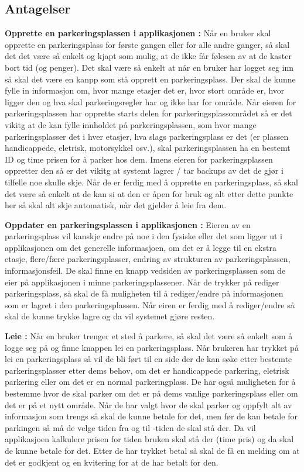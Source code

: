 \documentclass[12pt]{article}
\begin{document}
    \subsection{Antagelser}
    \textbf{Opprette en parkeringsplassen i applikasjonen :} Når en bruker skal opprette en parkeringsplass for første gangen eller for alle andre ganger, så skal det det være så enkelt og kjapt som mulig, at de ikke får følesen av at de kaster bort tid (og penger). Det skal være så enkelt at når en bruker har logget seg inn så skal det være en kanpp som stå opprett en parkeringsplass. Der skal de kunne fylle in informasjon om, hvor mange etasjer det er, hvor stort område er, hvor ligger den og hva skal parkeringsregler har og ikke har for område. Når eieren for parkeringsplassen har opprette starts delen for parkeringsplassområdet så er det vikitg at de kan fylle innholdet på parkeringsplassen, som hvor mange parkeringsplasser det i hver etasjer, hva slags parkeringsplass er det (er plassen handicappede, eletrisk, motorsykkel osv.), skal parkeringsplassen ha en bestemt ID og time prisen for å parker hos dem. Imens eieren for parkeringsplassen oppretter den så er det vikitg at systemt lagrer / tar backups av det de gjør i tilfelle noe skulle skje. Når de er ferdig med å opprette en parkeringsplass, så skal det være så enkelt at de kan si at den er åpen for bruk og alt etter dette punkte her så skal alt skje automatisk, når det gjelder å leie fra dem.
    
    \textbf{Oppdater en parkeringsplassen i applikasjonen :} Eieren av en parkeringsplass vil kanskje endre på noe i den fysiske eller det som ligger ut i applikasjonen om det generelle informasjoen, om det er å legge til en ekstra etasje, flere/fære parkeringsplasser, endring av strukturen av parkeringsplassen, informasjonsfeil. De skal finne en knapp vedsiden av parkeringsplassen som de eier på applikasjonen i minne parkeringsplassener. Når de trykker på rediger parkeringsplass, så skal de få muligheten til å rediger/endre på informasjonen som er lagret i den parkeringsplassen. Når eiren er ferdig med å rediger/endre så skal de kunne trykke lagre og da vil systemet gjøre resten.
    
    \textbf{Leie :} Når en bruker trenger et sted å parkere, så skal det være så enkelt som å logge seg på og finne knappen lei en parkeringsplass. Når brukeren har trykket på lei en parkeringsplass så vil de bli ført til en side der de kan søke etter bestemte parkeringsplasser etter dems behov, om det er handicappede parkering, eletrisk parkering eller om det er en normal parkeringplass. De har også muligheten for å bestemme hvor de skal parker om det er på dems vanlige parkeringsplass eller om det er på et nytt område. Når de har valgt hvor de skal parker og oppfylt alt av informasjon som trengs så skal de kunne betale for det, men før de kan betale for parkingen så må de velge tiden fra og til -tiden de skal stå der. Da vil applikasjoen kalkulere prisen for tiden bruken skal stå der (time pris) og da skal de kunne betale for det. Etter de har trykket betal så skal de få en melding om at det er godkjent og en kvitering for at de har betalt for den.
    
\end{document}
